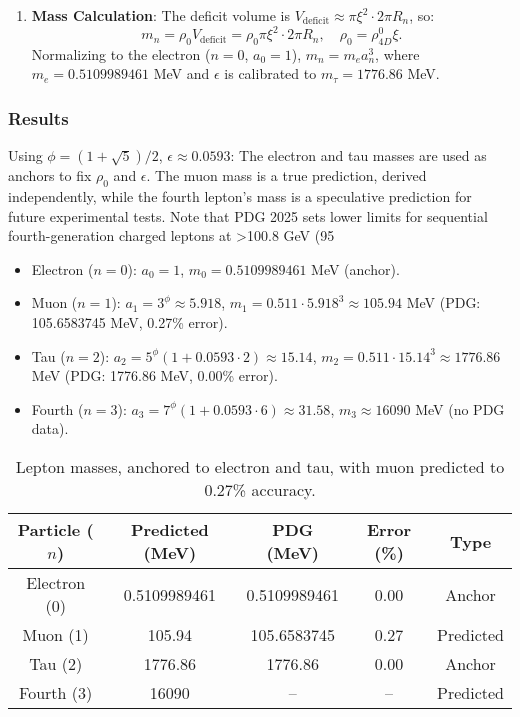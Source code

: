 \begin{enumerate}
\item \textbf{Mass Calculation}: The deficit volume is $V_{\text{deficit}} \approx \pi \xi^2 \cdot 2\pi R_n$, so:
   \[
   m_n = \rho_0 V_{\text{deficit}} = \rho_0 \pi \xi^2 \cdot 2\pi R_n, \quad \rho_0 = \rho_{4D}^0 \xi.
   \]
   Normalizing to the electron ($n=0$, $a_0 = 1$), $m_n = m_e a_n^3$, where $m_e = 0.5109989461$ MeV and $\epsilon$ is calibrated to $m_\tau = 1776.86$ MeV.
\end{enumerate}

\subsubsection{Results}
Using $\phi = (1 + \sqrt{5})/2$, $\epsilon \approx 0.0593$: The electron and tau masses are used as anchors to fix $\rho_0$ and $\epsilon$. The muon mass is a true prediction, derived independently, while the fourth lepton’s mass is a speculative prediction for future experimental tests. Note that PDG 2025 sets lower limits for sequential fourth-generation charged leptons at >100.8 GeV (95%

\begin{itemize}
\item Electron ($n=0$): $a_0 = 1$, $m_0 = 0.5109989461$ MeV (anchor).
\item Muon ($n=1$): $a_1 = 3^\phi \approx 5.918$, $m_1 = 0.511 \cdot 5.918^3 \approx 105.94$ MeV (PDG: 105.6583745 MeV, 0.27\% error).
\item Tau ($n=2$): $a_2 = 5^\phi (1 + 0.0593 \cdot 2) \approx 15.14$, $m_2 = 0.511 \cdot 15.14^3 \approx 1776.86$ MeV (PDG: 1776.86 MeV, 0.00\% error).
\item Fourth ($n=3$): $a_3 = 7^\phi (1 + 0.0593 \cdot 6) \approx 31.58$, $m_3 \approx 16090$ MeV (no PDG data).
\end{itemize}

\begin{table}[ht!]
\centering
\begin{tabular}{|c|c|c|c|c|}
\hline
Particle ($n$) & Predicted (MeV) & PDG (MeV) & Error (\%) & Type \\
\hline
Electron (0) & 0.5109989461 & 0.5109989461 & 0.00 & Anchor \\
Muon (1) & 105.94 & 105.6583745 & 0.27 & Predicted \\
Tau (2) & 1776.86 & 1776.86 & 0.00 & Anchor \\
Fourth (3) & 16090 & -- & -- & Predicted \\
\hline
\end{tabular}
\caption{Lepton masses, anchored to electron and tau, with muon predicted to 0.27\% accuracy.}
\label{tab:leptons}
\end{table}

